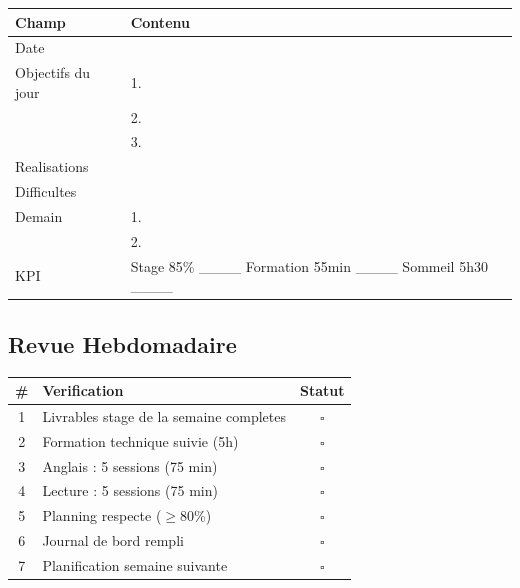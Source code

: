 \documentclass[12pt,a4paper]{article}
\begin{document}
\begin{table}[h]
\centering
\begin{tabular}{|p{3cm}|p{11cm}|}
\hline
\rowcolor{gray!20}
\textbf{Champ} & \textbf{Contenu} \\
\hline
Date & \underline{\hspace{10cm}} \\
\hline
Objectifs du jour & 1. \underline{\hspace{8cm}} \\
& 2. \underline{\hspace{8cm}} \\
& 3. \underline{\hspace{8cm}} \\
\hline
Realisations & \underline{\hspace{11cm}} \\
\hline
Difficultes & \underline{\hspace{11cm}} \\
\hline
Demain & 1. \underline{\hspace{8cm}} \\
& 2. \underline{\hspace{8cm}} \\
\hline
KPI & Stage 85\% \_\_\_\_ \quad Formation 55min \_\_\_\_ \quad Sommeil 5h30 \_\_\_\_ \\
\hline
\end{tabular}
\end{table}

\subsection*{Revue Hebdomadaire}

\begin{table}[h]
\centering
\begin{tabular}{|c|p{9cm}|c|}
\hline
\rowcolor{gray!20}
\textbf{\#} & \textbf{Verification} & \textbf{Statut} \\
\hline
1 & Livrables stage de la semaine completes & $\square$ \\
2 & Formation technique suivie (5h) & $\square$ \\
3 & Anglais : 5 sessions (75 min) & $\square$ \\
4 & Lecture : 5 sessions (75 min) & $\square$ \\
5 & Planning respecte ($\ge$80\%) & $\square$ \\
6 & Journal de bord rempli & $\square$ \\
7 & Planification semaine suivante & $\square$ \\
\hline
\end{tabular}
\end{table}
\end{document}
